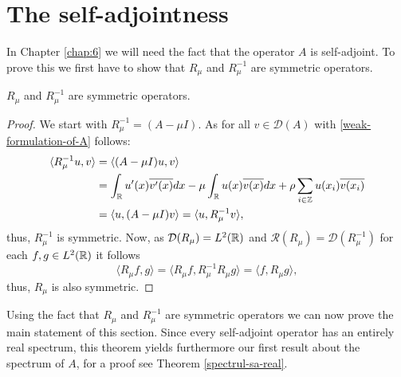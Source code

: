 \section{The self-adjointness} \label{sec:3.3}

In Chapter \ref{chap:6} we will need the fact that the operator $A$ is self-adjoint. To prove this we first have to show that $R_{\mu}$ and $R_{\mu}^{-1}$ are symmetric operators.

\begin{theorem} \label{2.2:thm-RmuSymmetric}
	$R_{\mu}$ and $R_{\mu}^{-1}$ are symmetric operators.
	
	\begin{proof}
		We start with $R_{\mu}^{-1} = (A - \mu I)$. As for all $v \in \mathcal{D}(A)$ with \eqref{weak-formulation-of-A} follows:
			\begin{align*}
				\langle R_{\mu}^{-1} u, v \rangle & = \langle (A - \mu I) u, v \rangle \\
					& = \int_{\mathbb{R}} u'(x) \overline{v'(x)} dx -  \mu \int_{\mathbb{R}} u(x) \overline{v(x)} dx + \rho \sum_{i \in \mathbb{Z}} u(x_{i}) \overline{v(x_{i})} \\
					& = \langle u, (A - \mu I) v \rangle = \langle u,  R_{\mu}^{-1} v \rangle,
			\end{align*}
		thus, $R_{\mu}^{-1}$ is symmetric. Now, as $\mathcal{D}(R_{\mu}) = L^{2}(\mathbb{R})$ and $\mathcal{R}(R_{\mu}) = \mathcal{D}(R_{\mu}^{-1})$ for each $f, g \in L^{2}(\mathbb{R})$ it follows
		\[  \langle R_{\mu} f, g \rangle =  \langle R_{\mu} f, R_{\mu}^{-1} R_{\mu} g \rangle = \langle f, R_{\mu} g \rangle, \]
		thus, $R_{\mu}$ is also symmetric.
	\end{proof}
\end{theorem}

Using the fact that $R_{\mu}$ and $R_{\mu}^{-1}$ are symmetric operators we can now prove the main statement of this section. Since every self-adjoint operator has an entirely real spectrum, this theorem yields furthermore our first result about the spectrum of $A$, for a proof see Theorem \ref{spectrul-sa-real}.

